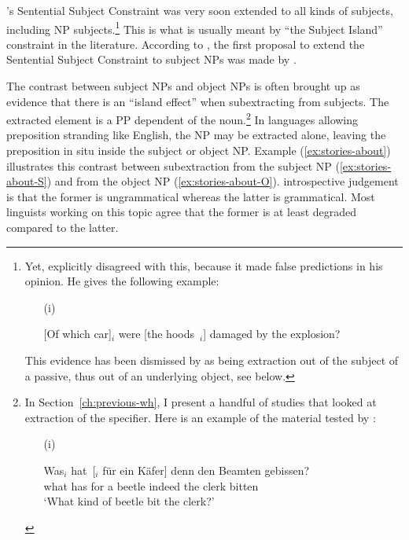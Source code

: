 \citeauthor{Ross.1967}'s Sentential Subject Constraint was very soon extended to all kinds of subjects, including NP subjects.\footnote{Yet, \citet{Ross.1967} explicitly disagreed with this, because it made false predictions in his opinion. He gives the following example:

\begin{itemize}
    \item[(i)] \citep[242]{Ross.1967} 
    \item[] [Of which car]$_i$ were [the hoods~\trace{}$_i$] damaged by the explosion? 
\end{itemize}
This evidence has been dismissed by \citet{Chomsky.2008} as being extraction out of the subject of a passive, thus out of an underlying object, see below.}
This is what is usually meant by ``the Subject Island'' constraint in the literature. According to \citet[158]{Erteschik-Shir.1973}, the first proposal to extend the Sentential Subject Constraint to subject NPs was made by \citet{Horn.1972}. 


The contrast between subject NPs and object NPs is often brought up as evidence that there is an ``island effect'' when subextracting from subjects. The extracted element is a PP dependent of the noun.\footnote{In Section~\ref{ch:previous-wh}, I present a handful of studies that looked at extraction of the specifier. Here is an example of the material tested by \citet{Jurka.2011}:
\begin{itemize}
    \item[(i)] \citep[125]{Jurka.2011}
    \item[] \gll Was$_i$ hat~[\trace{}$_i$ für ein Käfer] denn den Beamten gebissen?\\
    what has for a beetle indeed the clerk bitten\\
    \glt `What kind of beetle bit the clerk?'
\end{itemize}
} In languages allowing preposition stranding like English, the NP may be extracted alone, leaving the preposition in situ inside the subject or object NP. Example (\ref{ex:stories-about}) illustrates this contrast between subextraction from the subject NP (\ref{ex:stories-about-S}) and from the object NP (\ref{ex:stories-about-O}).  introspective judgement is that the former is ungrammatical whereas the latter is grammatical. Most linguists working on this topic agree that the former is at least degraded compared to the latter.


